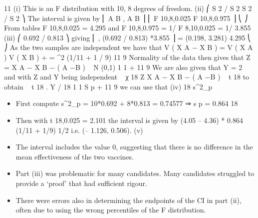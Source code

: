 \documentclass[a4paper,12pt]{article}
\begin{document}
11
(i) This is an F distribution with 10, 8 degrees of freedom.
(ii) ⎛ S 2 / S 2
S 2 / S 2 ⎞
The interval is given by ⎜ A B , A B ⎟
⎜ F 10,8,0.025 F 10,8,0.975 ⎟
⎝
⎠
From tables F 10,8,0.025 = 4.295 and F 10,8,0.975 = 1/ F 8,10,0.025 = 1/ 3.855
(iii)
⎛ 0.692 / 0.813
⎞
giving ⎜
, (0.692 / 0.813) *3.855 ⎟ = (0.198, 3.281)
4.295
⎝
⎠
As the two samples are independent we have that
V ( X A − X B ) =
V ( X A ) V ( X B )
+
= \sigma^2 (1/11 + 1 / 9)
11
9
Normality of the data then gives that Z =
X A − X B − ( \mu A −\mu B )
~ N (0,1)
1 1
\sigma
+
11 9
We are also given that Y =
2
and with Z and Y being independent
~ χ 18
Z
X A − X B − ( \mu A −\mu B )
~ t 18 to obtain
~ t 18 .
Y / 18
1 1
S p
+
11 9
we can use that
(iv)
18 s^2_p
\begin{itemize}
\item First compute s^2_p =
10*0.692 + 8*0.813
= 0.74577 ⇒ s p = 0.864
18
\item Then with t 18,0.025 = 2.101 the interval is given by (4.05 – 4.36)  *
0.864 (1/11 + 1/9) 1/2 i.e. (– 1.126, 0.506).
(v)
\item The interval includes the value 0, suggesting that there is no difference in the
mean effectiveness of the two vaccines.
\item Part (iii) was problematic for many candidates. Many candidates struggled to provide a
‘proof’ that had sufficient rigour.
\item There were errors also in determining the endpoints of the
CI in part (ii), often due to using the wrong percentiles of the F distribution.
\end{itemize}
\end{document}

